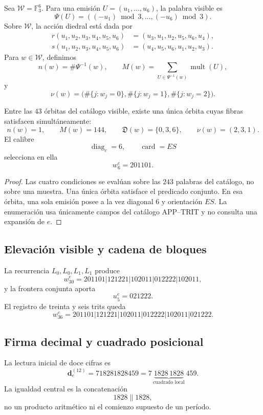 Sea \(\mathcal W=\mathbb F_3^6\). Para una emisión
\(U=(u_1,\ldots,u_6)\), la palabra visible es
\[
 \Psi(U)=((-u_1)\bmod3,\ldots,(-u_6)\bmod3).
\]
Sobre \(\mathcal W\), la acción diedral está dada por
\[
\begin{aligned}
 r(u_1,u_2,u_3,u_4,u_5,u_6)
 &=(u_3,u_1,u_2,u_5,u_6,u_4),\\
 s(u_1,u_2,u_3,u_4,u_5,u_6)
 &=(u_4,u_5,u_6,u_1,u_2,u_3).
\end{aligned}
\]
Para \(w\in\mathcal W\), definimos
\[
 n(w)=\#\Psi^{-1}(w),
 \qquad
 M(w)=\sum_{U\in\Psi^{-1}(w)}\operatorname{mult}(U),
\]
y
\[
 \nu(w)=
 \bigl(
 \#\{j:w_j=0\},
 \#\{j:w_j=1\},
 \#\{j:w_j=2\}
 \bigr).
\]

\begin{theorem}
\label{p12-83-c9-s2:thm:seleccion-estructural-e}
Entre las \(43\) órbitas del catálogo visible, existe una única órbita cuyas
fibras satisfacen simultáneamente:
\[
 n(w)=1,\qquad M(w)=144,\qquad
 \mathfrak D(w)=\{0,3,6\},\qquad
 \nu(w)=(2,3,1).
\]
El calibre
\[
 \operatorname{diag}_c=6,
 \qquad \operatorname{card}=ES
\]
selecciona en ella
\[
 \boxed{w_6^e=201101.}
\]
\end{theorem}

\begin{proof}
Las cuatro condiciones se evalúan sobre las \(243\) palabras del catálogo,
no sobre una muestra. Una única órbita satisface el predicado conjunto. En
esa órbita, una sola emisión posee a la vez diagonal \(6\) y orientación
\(ES\). La enumeración usa únicamente campos del catálogo APP--TRIT y no
consulta una expansión de \(e\).
\end{proof}

\subsection{Elevación visible y cadena de bloques}

La recurrencia \(L_0,L_0,L_1,L_1\) produce
\[
 w_{30}^{e}
 =201101|121221|102011|012222|102011,
\]
y la frontera conjunta aporta
\[
 u_5^e=021222.
\]
El registro de treinta y seis trits queda
\[
 w_{36}^{e}
 =201101|121221|102011|012222|102011|021222.
\]

\subsection{Firma decimal y cuadrado posicional}

La lectura inicial de doce cifras es
\[
 \mathbf d_e^{(12)}
 =718281828459
 =7\,\underbrace{1828\,1828}_{\text{cuadrado local}}\,459.
\]
La igualdad central es la concatenación
\[
 1828\mathbin{\|}1828,
\]
no un producto aritmético ni el comienzo supuesto de un período.

